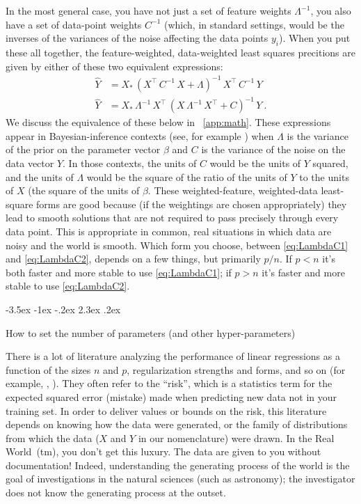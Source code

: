 \documentclass[12pt,letterpaper]{article}
\makeatletter
\renewcommand\section{\@startsection {section}{1}{\z@}%
  {-3.5ex \@plus -1ex \@minus -.2ex}%
  {2.3ex \@plus.2ex}%
  {\raggedright\normalfont\Large\bfseries}}
\makeatother
\begin{document}
In the most general case, you have not just a set of feature weights $\Lambda^{-1}$, you also have a set of data-point weights $C^{-1}$ (which, in standard settings, would be the inverses of the variances of the noise affecting the data points $y_i$).
When you put these all together, the feature-weighted, data-weighted least squares precitions are given by either of these two equivalent expressions:
\begin{align}\label{eq:LambdaC1}
    \hat{Y} &= X_\ast\,(X^\top\,C^{-1}\,X + \Lambda)^{-1}\,X^\top\,C^{-1}\,Y
    \\ \label{eq:LambdaC2}
    \hat{Y} &= X_\ast\,\Lambda^{-1}\,X^\top\,(X\,\Lambda^{-1}\,X^\top + C)^{-1}\,Y
    ~.
\end{align}
We discuss the equivalence of these below in \appendixname~\ref{app:math}. These expressions appear in Bayesian-inference contexts (see, for example \citealt{products}) when $\Lambda$ is the variance of the prior on the parameter vector $\beta$ and $C$ is the variance of the noise on the data vector $Y$. In those contexts, the units of $C$ would be the units of $Y$ squared, and the units of $\Lambda$ would be the square of the ratio of the units of $Y$ to the units of $X$ (the square of the units of $\beta$. These weighted-feature, weighted-data least-square forms are good because (if the weightings are chosen appropriately) they lead to smooth solutions that are not required to pass precisely through every data point. This is appropriate in common, real situations in which data are noisy and the world is smooth. Which form you choose, between \eqref{eq:LambdaC1} and \eqref{eq:LambdaC2}, depends on a few things, but primarily $p/n$. If $p<n$ it's both faster and more stable to use \eqref{eq:LambdaC1}; if $p>n$ it's faster and more stable to use \eqref{eq:LambdaC2}.

\section{How to set the number of parameters (and other hyper-parameters)}\label{sec:dd}

There is a lot of literature analyzing the performance of linear regressions as a function of the sizes $n$ and $p$, regularization strengths and forms, and so on (for example, \citealt{bartlett2020benign}, \citealt{hastie2019surprises} ).
They often refer to the ``risk'', which is a statistics term for the expected squared error (mistake) made when predicting new data not in your training set.
In order to deliver values or bounds on the risk, this literature depends on knowing how the data were generated, or the family of distributions from which the data ($X$ and $Y$ in our nomenclature) were drawn.
In the Real World~(tm), you don't get this luxury.
The data are given to you without documentation!
Indeed, understanding the generating process of the world is the goal of investigations in the natural sciences (such as astronomy); the investigator does not know the generating process at the outset.
\end{document}
